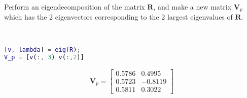 Perform an eigendecomposition of the matrix $\boldsymbol{R}$, and make a new matrix $\boldsymbol{V}_p$ which has the 2 eigenvectors corresponding to the 2 largest eigenvalues of $\boldsymbol{R}$.

\begin{solution} \
    \begin{lstlisting}[language=Matlab]
[v, lambda] = eig(R);
V_p = [v(:, 3) v(:,2)]
    \end{lstlisting}
    
    \begin{align*}
        \boldsymbol{V}_p = \begin{bmatrix}
            0.5786 &  0.4995 \\
            0.5723 & -0.8119 \\
            0.5811 &  0.3022
        \end{bmatrix}
    \end{align*}
\end{solution}